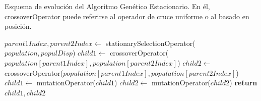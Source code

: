 \begin{algorithm}[H]
    \caption{Esquema de evolución del Algoritmo Genético Estacionario. En él, crossoverOperator puede referirse al operador de cruce uniforme o al basado en posición.}
\begin{algorithmic}
    \State $parent1Index, parent2Index \leftarrow$ stationarySelectionOperator($population, populDisp$)
    \State
    \State $child1 \leftarrow$ crossoverOperator($population[parent1Index], population[parent2Index]$)
    \State $child2 \leftarrow$ crossoverOperator($population[parent1Index], population[parent2Index]$)
    \State
     
        \State $child1 \leftarrow$ mutationOperator($child1$)
    \EndIf
    \State
        \State $child2 \leftarrow$ mutationOperator($child2$)
    \EndIf
    \State \textbf{return} $child1, child2$
\EndProcedure
\end{algorithmic}
\end{algorithm}

